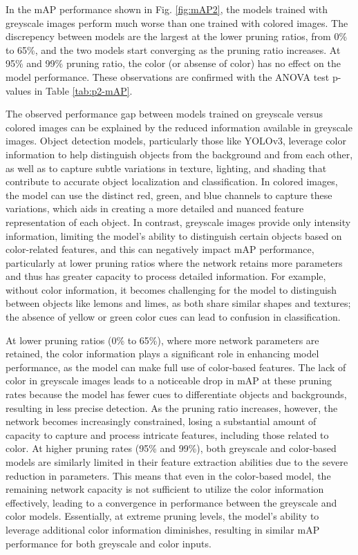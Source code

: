 \documentclass[journal,onecolumn,12pt]{IEEEtran}
\begin{document}
In the mAP performance shown in Fig. \ref{fig:mAP2}, the models trained with greyscale images perform much worse  
than one trained with colored images. The discrepency between models are the largest at the lower pruning ratios, from 0\% to 65\%, and the two models start converging as the pruning ratio increases. At 95\% and 99\% pruning ratio, the color (or absense of color) has no effect on the model performance. These observations are confirmed with the ANOVA test p-values in Table \ref{tab:p2-mAP}.

The observed performance gap between models trained on greyscale versus colored images can be explained by the reduced information available in greyscale images. Object detection models, particularly those like YOLOv3, leverage color information to help distinguish objects from the background and from each other, as well as to capture subtle variations in texture, lighting, and shading that contribute to accurate object localization and classification. In colored images, the model can use the distinct red, green, and blue channels to capture these variations, which aids in creating a more detailed and nuanced feature representation of each object. In contrast, greyscale images provide only intensity information, limiting the model's ability to distinguish certain objects based on color-related features, and this can negatively impact mAP performance, particularly at lower pruning ratios where the network retains more parameters and thus has greater capacity to process detailed information. For example, without color information, it becomes challenging for the model to distinguish between objects like lemons and limes, as both share similar shapes and textures; the absence of yellow or green color cues can lead to confusion in classification.

At lower pruning ratios (0\% to 65\%), where more network parameters are retained, the color information plays a significant role in enhancing model performance, as the model can make full use of color-based features. The lack of color in greyscale images leads to a noticeable drop in mAP at these pruning rates because the model has fewer cues to differentiate objects and backgrounds, resulting in less precise detection. As the pruning ratio increases, however, the network becomes increasingly constrained, losing a substantial amount of capacity to capture and process intricate features, including those related to color. At higher pruning rates (95\% and 99\%), both greyscale and color-based models are similarly limited in their feature extraction abilities due to the severe reduction in parameters. This means that even in the color-based model, the remaining network capacity is not sufficient to utilize the color information effectively, leading to a convergence in performance between the greyscale and color models. Essentially, at extreme pruning levels, the model's ability to leverage additional color information diminishes, resulting in similar mAP performance for both greyscale and color inputs.
\end{document}
